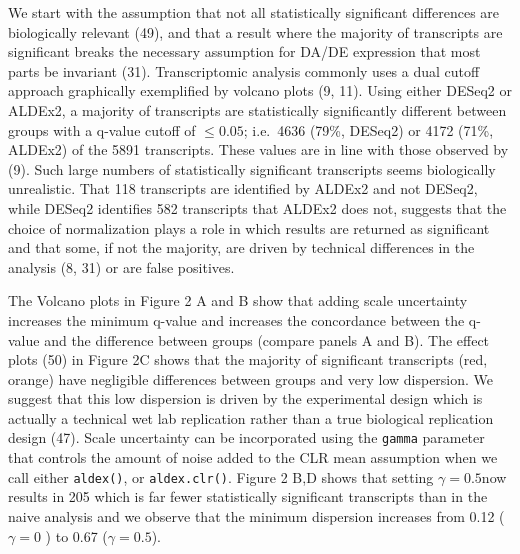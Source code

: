 \documentclass[
]{article}
\providecommand{\DIFadd}[1]{{\protect\color{blue}\uwave{#1}}} %
\providecommand{\DIFaddbegin}{} %
\providecommand{\DIFaddend}{} %
\newcommand{\DIFaddincludegraphics}[2][]{{\color{blue}\fbox{\DIFOincludegraphics[#1]{#2}}}} %
\DeclareRobustCommand{\DIFaddbegin}{\DIFOaddbegin \let\includegraphics\DIFaddincludegraphics} %
\DeclareRobustCommand{\DIFaddend}{\DIFOaddend \let\includegraphics\DIFOincludegraphics} %
\begin{document}
We start with the assumption that not all statistically significant
differences are biologically relevant (49), and that a result where the
majority of transcripts are significant breaks the necessary assumption
for DA/DE expression that most parts be invariant (31). Transcriptomic
analysis commonly uses a dual cutoff approach graphically exemplified by
volcano plots (9, 11). Using either DESeq2 or ALDEx2, a majority of
transcripts are statistically significantly different between groups
with a q-value cutoff of \(\le 0.05\); i.e.~4636 (79\%, DESeq2) or 4172
(71\%, ALDEx2) of the 5891 transcripts. These values are in line with
those observed by (9). Such large numbers of statistically significant
transcripts seems biologically unrealistic. That 118 transcripts are
identified by ALDEx2 and not DESeq2, while DESeq2 identifies 582
transcripts that ALDEx2 does not, suggests that the choice of
normalization plays a role in which results are returned as significant
and that some, if not the majority, are driven by technical differences
in the analysis (8, 31) or are false positives.

The Volcano plots in Figure 2 A and B show that adding scale uncertainty
increases the minimum q-value and increases the concordance between the
q-value and the difference between groups (compare panels A and B). The
effect plots (50) in Figure 2C shows that the majority of significant
transcripts (red, orange) have negligible differences between groups and
very low dispersion. We suggest that this low dispersion is driven by
the experimental design which is actually a technical wet lab
replication rather than a true biological replication design (47). Scale
uncertainty can be incorporated using the \texttt{gamma} parameter that
controls the amount of noise added to the CLR mean assumption when we
call either \texttt{aldex()}, or \texttt{aldex.clr()}. Figure 2 B,D
shows that setting \(\gamma=0.5\)\DIFaddbegin \DIFadd{, i.e.~adding 0.5 SD of uncertainty,
}\DIFaddend now results in 205 which is far fewer statistically significant
transcripts than in the naive analysis and we observe that the minimum
dispersion increases from 0.12 (\(\gamma = 0\) ) to 0.67
(\(\gamma=0.5\)).
\end{document}

